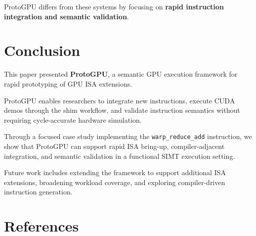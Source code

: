 \documentclass[11pt]{article}
\begin{document}
ProtoGPU differs from these systems by focusing on \textbf{rapid
instruction integration and semantic validation}.


\hypertarget{conclusion}{%
\section{Conclusion}\label{conclusion}}

This paper presented \textbf{ProtoGPU}, a semantic GPU execution
framework for rapid prototyping of GPU ISA extensions.

ProtoGPU enables researchers to integrate new instructions, execute CUDA
demos through the shim workflow, and validate instruction semantics
without requiring cycle-accurate hardware simulation.

Through a focused case study implementing the \texttt{warp\_reduce\_add}
instruction, we show that ProtoGPU can support rapid ISA bring-up,
compiler-adjacent integration, and semantic validation in a functional
SIMT execution setting.

Future work includes extending the framework to support additional ISA
extensions, broadening workload coverage, and exploring compiler-driven
instruction generation.


\hypertarget{references}{%
\section*{References}\label{references}}
\end{document}
